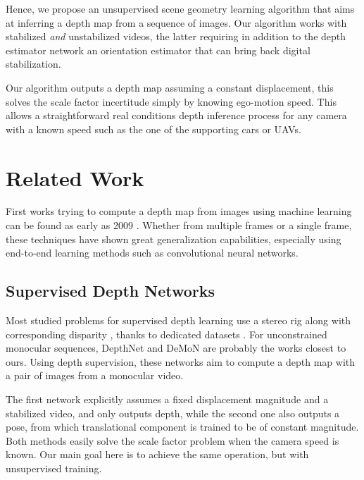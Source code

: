 \documentclass[runningheads]{llncs}
\begin{document}
Hence, we propose an unsupervised scene geometry learning algorithm that aims at inferring a depth map from a sequence of images.
Our algorithm works with stabilized {\em and} unstabilized videos, the latter
requiring in addition to the depth estimator network an orientation estimator that can bring back digital stabilization.

Our algorithm outputs a depth map assuming a constant displacement, this solves the scale factor incertitude simply by knowing ego-motion speed.
This allows a straightforward real conditions depth inference process for any camera with a known speed such as the one of the supporting cars or UAVs.

\section{Related Work}

First works trying to compute a depth map from images using machine learning can be found as early as 2009 \cite{4531745}. Whether from multiple frames or a single frame, these techniques have shown great generalization capabilities, especially using end-to-end learning methods such as convolutional neural networks.

\subsection{Supervised Depth Networks}
Most studied problems for supervised depth learning use a stereo rig along with corresponding disparity \cite{zbontar2016stereo, Kendall2017EndtoEndLO}, thanks to dedicated datasets \cite{geiger2013vision, MIFDB16}. For unconstrained monocular sequences, DepthNet and DeMoN \cite{isprs-annals-IV-2-W3-67-2017,UZUMIDB17} are probably the works closest to ours.
Using depth supervision, these networks aim to compute a depth map with a pair of images from a monocular video.

The first network explicitly assumes a fixed displacement magnitude and a stabilized video, and only outputs depth, while the second one also outputs a pose, from which translational component is trained to be of constant magnitude.
Both methods easily solve the scale factor problem when the camera speed is known. Our main goal here is to achieve the same operation, but with unsupervised training.
\end{document}
